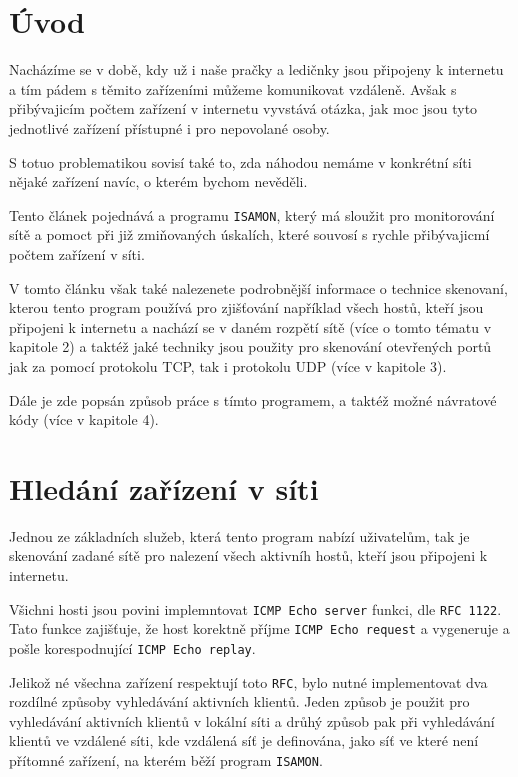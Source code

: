
\chapter{Úvod}
Nacházíme se v době, kdy už i naše pračky a ledičnky jsou připojeny k internetu a tím pádem s těmito zařízeními můžeme komunikovat vzdáleně. Avšak s přibývajicím počtem zařízení v internetu vyvstává otázka, jak moc jsou tyto  jednotlivé zařízení přístupné i pro nepovolané osoby.
\newline

S totuo problematikou sovisí také to, zda náhodou nemáme v konkrétní síti nějaké zařízení navíc, o kterém bychom nevěděli. 
\newline

Tento článek pojednává a programu \texttt{ISAMON}, který má sloužit pro monitorování sítě a pomoct při již zmiňovaných úskalích, které souvosí s rychle přibývajicmí počtem zařízení v síti.
\newline

V tomto článku však také nalezenete podrobnější informace o technice skenovaní, kterou tento program používá pro zjišťování například všech hostů, kteří jsou připojeni k internetu a nachází se v daném rozpětí sítě (více o tomto tématu v kapitole 2) a taktéž jaké techniky jsou použity pro skenování otevřených portů jak za pomocí protokolu TCP, tak i protokolu UDP (více v kapitole 3).
\newline

Dále je zde popsán způsob práce s tímto programem, a taktéž možné návratové kódy (více v kapitole 4).


\chapter{Hledání zařízení v síti}
Jednou ze základních služeb, která tento program nabízí uživatelům, tak je skenování zadané sítě pro nalezení všech aktivníh hostů, kteří jsou připojeni k internetu.
\newline

Všichni hosti jsou povini implemntovat \texttt{ICMP Echo server} funkci, dle \texttt{RFC 1122}. Tato funkce zajišťuje, že host korektně příjme \texttt{ICMP Echo request} a vygeneruje a pošle korespodnující \texttt{ICMP Echo replay}.\cite{RFC1122}

Jelikož né všechna zařízení respektují toto \texttt{RFC}, bylo nutné  implementovat dva rozdílné způsoby vyhledávání aktivních klientů. Jeden způsob je použit pro vyhledávání aktivních klientů v lokální síti a drůhý způsob pak při vyhledávání klientů ve vzdálené síti, kde vzdálená síť je definována, jako síť ve které není přítomné zařízení, na kterém běží program \texttt{ISAMON}.

